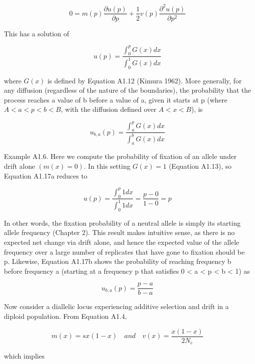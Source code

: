 \documentclass{article}
\begin{document}
\begin{equation}
0=m(p)\frac{\partial u(p)}{\partial p}+\frac{1}{2}v(p)\frac{\partial^{2}u(p)}{\partial p^{2}}
\end{equation}

This has a solution of

\begin{equation}
u(p)=\frac{\int_{0}^{p}G(x)dx}{\int_{0}^{1}G(x)dx}
\end{equation}

where  $ G(x) $ is defined by Equation A1.12 (Kimura 1962). More generally, for any diffusion (regardless of the nature of the boundaries), the probability that the process reaches a value of b before a value of a, given it starts at p (where  $ A < a < p < b < B $, with the diffusion defined over  $ A < x < B $), is

\begin{equation}
u_{b,a}(p)=\frac{\int_{a}^{p}G(x)dx}{\int_{a}^{b}G(x)dx}
\end{equation}

Example A1.6. Here we compute the probability of fixation of an allele under drift alone  $ (m(x) = 0) $. In this setting  $ G(x) = 1 $ (Equation A1.13), so Equation A1.17a reduces to

\begin{equation}
u(p)=\frac{\int_{0}^{p}1dx}{\int_{0}^{1}1dx}=\frac{p-0}{1-0}=p
\end{equation}

In other words, the fixation probability of a neutral allele is simply its starting allele frequency (Chapter 2). This result makes intuitive sense, as there is no expected net change via drift alone, and hence the expected value of the allele frequency over a large number of replicates that have gone to fixation should be p. Likewise, Equation A1.17b shows the probability of reaching frequency b before frequency a (starting at a frequency p that satisfies 0 < a < p < b < 1) as

\begin{equation}
u_{b,a}(p)=\frac{p-a}{b-a}
\end{equation}

Now consider a diallelic locus experiencing additive selection and drift in a diploid population. From Equation A1.4,

\begin{equation}
m(x)=s x(1-x)\quad and\quad v(x)=\frac{x(1-x)}{2N_{e}}
\end{equation}

which implies
\end{document}

